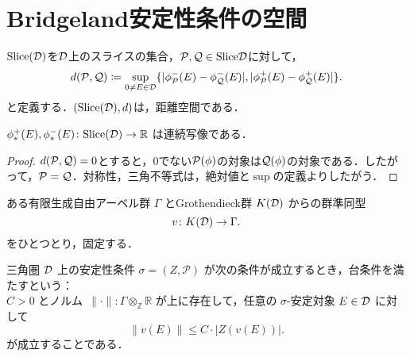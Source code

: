 \section{Bridgeland安定性条件の空間}
\begin{defn}\cite{Bri07}
$\mathrm{Slice(\D)}$を$\D$上のスライスの集合，$\mathcal P,\mathcal Q\in\mathrm{Slice} \D$に対して，
\[d(\mathcal P,\mathcal Q)\coloneq\sup_{0\neq E\in\D}\{|\phi^-_{\P}(E)-\phi_{\Q}^-(E)|,|\phi^+_{\P}(E)-\phi_{\Q}^+(E)|\}.\]
と定義する．$(\mathrm{Slice(\D)},d)$は，距離空間である．
\end{defn}
\begin{lemm}
	$\phi_{*}^+(E),\phi_{*}^-(E)\colon \mathrm{Slice(\D)}\rightarrow\RR$
	は連続写像である．
\end{lemm}
\begin{proof}
	$d(\P,\Q)=0$とすると，$0$でない$\P(\phi)$の対象は$\Q(\phi)$の対象である．したがって，$\P=\Q$．対称性，三角不等式は，絶対値と$\sup$の定義よりしたがう．
\end{proof}

ある有限生成自由アーベル群 $\Gamma$ とGrothendieck群 $K(\D)$ からの群準同型
\[
v \colon K(\D) \to \Gamma .
\]
をひとつとり，固定する．
\begin{defn}\cite{Bri07}
三角圏 $\D$ 上の安定性条件 $\sigma = (Z, \mathcal{P})$ が次の条件が成立するとき，台条件を満たすという：\\
$C > 0$ とノルム\ $\|\cdot\|\colon\Gamma \otimes_{\mathbb{Z}} \mathbb{R} $ が上に存在して，任意の $\sigma$-安定対象 $E \in \D$ に対して
\[
\|v(E)\| \leq C \cdot |Z(v(E))| .
\]
が成立することである．
\end{defn}

